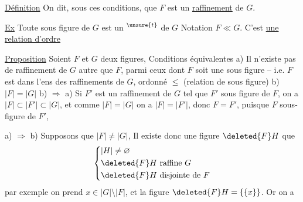 \uline{Définition} On dit, sous ces conditions, que $F$ est un \uline{raffinement} de $G$.

\uline{Ex} Toute sous figure de $G$ est un $^{\unsure{t}}$ de $G$
Notation $F\ll G$. C'est \uline{une relation d'ordre}

\uline{Proposition} Soient $F$ et $G$ deux figures,  Conditions équivalentes
a)  Il n'existe pas de raffinement de $G$ autre que $F$, parmi ceux dont $F$ soit une sous figure -- i.e. $F$ est  dans l'ens des raffinements de $G$, ordonné  $\leq$ (relation de sous figure)
b)  $|F|=|G|$ 
b) $\Rightarrow$ a) Si $F'$ est un raffinement de $G$ tel que $F'$ sous figure de $F$, on a $|F|\subset|F'|\subset|G|$, et comme $|F|=|G|$ on
a $|F|=|F'|$, donc $F=F'$, puisque $F$ sous-figure de $F'$,

a) $\Rightarrow$ b) Supposons que $|F|\ne|G|$,  Il existe donc une figure $\deleted{F}H$   que 
\[ \left\{\begin{aligned} &|H|\ne\varnothing\\ &\deleted{F}H\ \text{raffine }G\\ &\deleted{F}H\ \text{disjointe de }F \end{aligned}\right. \]
par exemple on prend  $x\in|G|\setminus|F|$, et la figure $\deleted{F}H=\{\{x\}\}$. Or on a

